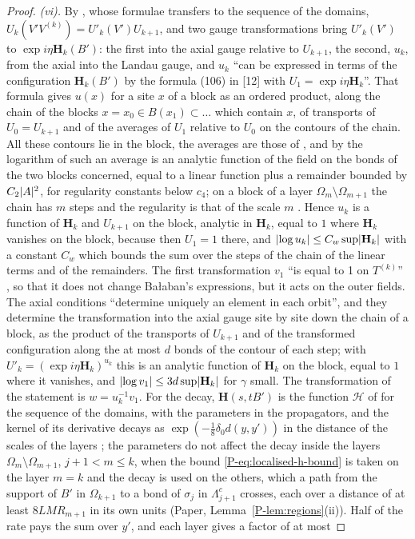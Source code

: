\documentclass[11pt]{preprint}
\DeclarePairedDelimiter{\abs}{\lvert}{\rvert}
\numberwithin{equation}{section}
\theoremstyle{definition}
\theoremstyle{remark}
\theoremstyle{plain}
\begin{document}
\begin{proof}
\emph{(vi).} By \cite[p.~265]{BalabanRG1}, whose formulae \cite[p.~267]{BalabanCRE} transfers to the sequence of the domains, $U_k(V'V^{(k)}) = U'_k(V')U_{k+1}$, and two gauge transformations bring $U'_k(V')$ to $\exp i\eta\mathbf H_k(B')$: the first into the axial gauge relative to $U_{k+1}$, the second, $u_k$, from the axial into the Landau gauge, and $u_k$ ``can be expressed in terms of the configuration $\mathbf H_k(B')$ by the formula (106) in [12] with $U_1 = \exp i\eta\mathbf H_k$''. That formula \cite[(106), p.~33]{BalabanAVG} gives $u(x)$ for a site $x$ of a block as an ordered product, along the chain of the blocks $x = x_0 \in B(x_1) \subset \dots$ which contain $x$, of transports of $U_0 = U_{k+1}$ and of the averages of $U_1$ relative to $U_0$ on the contours of the chain. All these contours lie in the block, the averages are those of \cite[(105), p.~33]{BalabanAVG}, and by \cite[Proposition~4, pp.~38--39]{BalabanAVG} the logarithm of such an average is an analytic function of the field on the bonds of the two blocks concerned, equal to a linear function plus a remainder bounded by $C_2\abs A^2$, for regularity constants below $c_4$; on a block of a layer $\Omega_m \setminus \Omega_{m+1}$ the chain has $m$ steps and the regularity is that of the scale $m$ \cite[p.~276]{BalabanCRE}. Hence $u_k$ is a function of $\mathbf H_k$ and $U_{k+1}$ on the block, analytic in $\mathbf H_k$, equal to $1$ where $\mathbf H_k$ vanishes on the block, because then $U_1 = 1$ there, and $\abs{\log u_k} \leq C_w\sup\abs{\mathbf H_k}$ with a constant $C_w$ which bounds the sum over the steps of the chain of the linear terms and of the remainders. The first transformation $v_1$ ``is equal to 1 on $T^{(k)}$'' \cite[p.~265]{BalabanRG1}, so that it does not change Ba{\l}aban's expressions, but it acts on the outer fields. The axial conditions \cite[(1.19), p.~79]{BalabanREG} ``determine uniquely an element in each orbit'', and they determine the transformation into the axial gauge site by site down the chain of a block, as the product of the transports of $U_{k+1}$ and of the transformed configuration along the at most $d$ bonds of the contour of each step; with $U'_k = (\exp i\eta\mathbf H_k)^{u_k}$ this is an analytic function of $\mathbf H_k$ on the block, equal to $1$ where it vanishes, and $\abs{\log v_1} \leq 3d\sup\abs{\mathbf H_k}$ for $\gamma$ small. The transformation of the statement is $w = u_k^{-1}v_1$. For the decay, $\mathbf H(s, tB')$ is the function $\mathscr H$ of \cite[Proposition~9, p.~309]{BalabanVAR} for the sequence of the domains, with the parameters in the propagators, and the kernel of its derivative decays as $\exp(-\frac18\delta_0d(y, y'))$ in the distance of the scales of the layers \cite[(190), p.~308]{BalabanVAR}; the parameters do not affect the decay inside the layers $\Omega_m \setminus \Omega_{m+1}$, $j + 1 < m \leq k$, when the bound \eqref{P-eq:localised-h-bound} is taken on the layer $m = k$ and the decay is used on the others, which a path from the support of $B'$ in $\Omega_{k+1}$ to a bond of $\sigma_j$ in $\Lambda_{j+1}^c$ crosses, each over a distance of at least $8LMR_{m+1}$ in its own units (Paper, Lemma~\ref{P-lem:regions}(ii)). Half of the rate pays the sum over $y'$, and each layer gives a factor of at most 
\end{proof}
\end{document}

